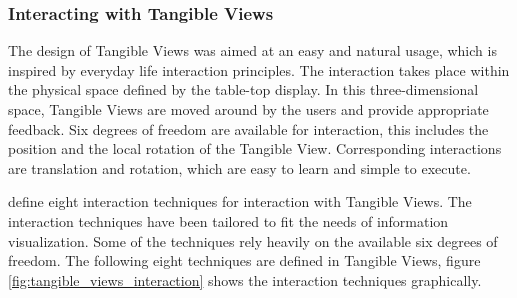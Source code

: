 \subsubsection{Interacting with Tangible Views}
The design of Tangible Views was aimed at an easy and natural usage, which is inspired by everyday life interaction principles. The interaction takes place within the physical space defined by the table-top display. In this three-dimensional space, Tangible Views are moved around by the users and provide appropriate feedback. Six degrees of freedom are available for interaction, this includes the position and the local rotation of the Tangible View. Corresponding interactions are translation and rotation, which are easy to learn and simple to execute.

\cite{spindler10} define eight interaction techniques for interaction with Tangible Views. The interaction techniques have been tailored to fit the needs of information visualization. Some of the techniques rely heavily on the available six degrees of freedom. The following eight techniques are defined in Tangible Views, figure \ref{fig:tangible_views_interaction} shows the interaction techniques graphically.

